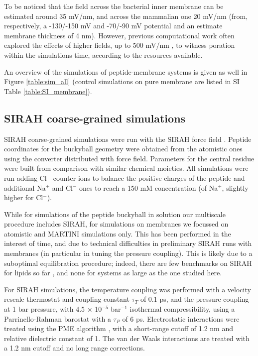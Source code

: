To be noticed that the field across the bacterial inner membrane can be estimated around 35 mV/nm, and across the mammalian one 20 mV/nm (from, respectively, a -130/-150 mV and -70/-90 mV potential \citep{Yeaman2003,Wilson2011} and an estimate membrane thickness of 4 nm). However, previous computational work often explored the effects of higher fields, up to 500 mV/nm \citep{Tieleman2004, Bockmann2008, Piggot2011}, to witness poration within the simulations time, according to the resources available.

An overview of the simulations of peptide-membrane systems is given as well in Figure \ref{table:sim_all} (control simulations on pure membrane are listed in SI Table \ref{table:SI_membrane}).

\subsection{SIRAH coarse-grained simulations}
SIRAH coarse-grained simulations were run with the SIRAH force field \citep{Machado2018}. Peptide coordinates for the buckyball geometry were obtained from the atomistic ones using the converter distributed with force field. Parameters for the central residue were built from comparison with similar chemical moieties. All simulations were run adding Cl$^-$ counter ions to balance the positive charges of the peptide and additional Na$^+$  and Cl$^-$ ones to reach a 150 mM concentration (of Na$^+$, slightly higher for Cl$^-$).

While for simulations of the peptide buckyball in solution our multiscale procedure includes SIRAH, for simulations on membranes we focussed on atomistic and MARTINI simulations only. This has been performed in the interest of time, and due to technical difficulties in preliminary SIRAH runs with membranes (in particular in tuning the pressure coupling).
%
This is likely due to a suboptimal equilibration procedure; indeed, there are few benchmarks on SIRAH for lipids so far \citep{Barrera2019}, and none for systems as large as the one studied here.

For SIRAH simulations, the temperature coupling was performed with a velocity rescale thermostat \citep{Bussi2007} and coupling constant $\tau _T$ of 0.1 ps, and the pressure coupling at 1 bar pressure, with 4.5 $\times$ 10$^{-5}$ bar$^{-1}$ isothermal compressibility, using a Parrinello-Rahman barostat \citep{Parrinello1981} with a $\tau _P$ of 6 ps. Electrostatic interactions were treated using the PME algorithm \citep{Essmann1995}, with a short-range cutoff of 1.2 nm and relative dielectric constant of 1. The van der Waals interactions are treated with a 1.2 nm cutoff and no long range corrections.

